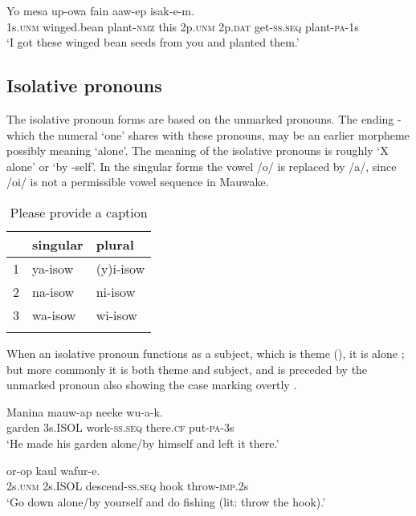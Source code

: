 \ea%
\label{ex:3:x596}
\gll Yo mesa up-owa fain   aaw-ep isak-e-m.\\
1s.\textsc{unm} winged.bean plant-\textsc{nmz} this 2p.\textsc{unm} 2p.\textsc{dat} get-\textsc{ss}.\textsc{seq} plant-\textsc{pa}-1s\\
\glt`I got these winged bean seeds from you and planted them.'
\z

\subsection{Isolative pronouns}\label{sec:3:y:x}
{}
The isolative pronoun forms are based on the unmarked pronouns. The ending \nobreakdash-\textstyleStyleVernacularWordsItalic{,} which the numeral  `one' shares with these pronouns, may be an earlier morpheme possibly meaning `alone'. The meaning of the isolative pronouns is roughly `X alone' or `by -self'. In the singular forms the vowel /o/ is replaced by /a/, since /oi/ is not a permissible vowel sequence in Mauwake. 

\begin{table}
\caption{Please provide a caption}
\label{} 
\begin{tabular}{lll}
\mytoprule
&singular &plural\\
\midrule
1 &ya-isow &(y)i-isow\\
2 &na-isow &ni-isow\\
3 &wa-isow &wi-isow\\
\mybottomrule
\end{tabular}
\end{table}


When an isolative pronoun functions as a subject, which is  theme (), it is alone ; but more commonly it is both theme and subject, and is preceded by the unmarked pronoun also showing the case marking overtly . 

\ea%
\label{ex:3:x599}
\gll Manina  mauw-ap neeke wu-a-k. \\
garden 3s.ISOL work-\textsc{ss}.\textsc{seq} there.\textsc{cf} put-\textsc{pa}-3s\\
\glt`He made his garden alone/by himself and left it there.'
\z

\ea%
\label{ex:3:x600}
\gll {}  or-op kaul wafur-e. \\
2s.\textsc{unm} 2s.ISOL descend-\textsc{ss}.\textsc{seq} hook throw-\textsc{imp}.2s\\
\glt`Go down alone/by yourself and do fishing (lit: throw the hook).'
\z

